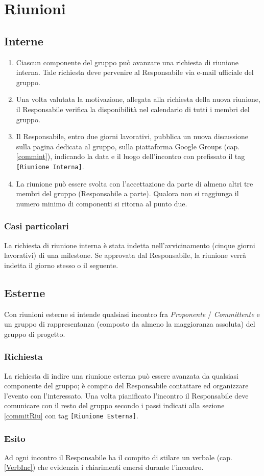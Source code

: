 \section{Riunioni}{

	\subsection{Interne}{
		\label{commitRiu}
		\begin{enumerate}
		
		\item Ciascun componente del gruppo può avanzare una richiesta di riunione interna. Tale richiesta deve pervenire al Responsabile via e-mail ufficiale del gruppo.
			
		\item Una volta valutata la motivazione, allegata alla richiesta della nuova riunione, il Responsabile verifica la disponibilità nel calendario di tutti i membri del gruppo. 
		
		\item Il Responsabile, entro due giorni lavorativi, pubblica un nuova discussione sulla pagina dedicata al gruppo, sulla piattaforma Google Groups (cap. \ref{commint}), indicando la data e il luogo dell'incontro con prefissato il tag \texttt{[Riunione Interna]}.
		
		\item La riunione può essere svolta con l'accettazione da parte di almeno altri tre membri del gruppo (Responsabile a parte). Qualora non si raggiunga il numero minimo di componenti si ritorna al punto due.
		\end{enumerate}
		
		\subsubsection{Casi particolari}{
			La richiesta di riunione interna è stata indetta nell'avvicinamento (cinque giorni lavorativi) di una milestone\g . Se approvata dal Responsabile, la riunione verrà indetta il giorno stesso o il seguente.
		}
	}

	\subsection{Esterne}{
		Con riunioni esterne si intende qualsiasi incontro fra \textit{Proponente} / \textit{Committente}  e un gruppo di rappresentanza (composto da almeno la maggioranza assoluta) del gruppo di progetto. 
		\subsubsection{Richiesta}{
			La richiesta di indire una riunione esterna  può essere avanzata da qualsiasi componente del gruppo; è compito del Responsabile contattare ed organizzare l'evento con l'interessato. Una volta pianificato l'incontro il Responsabile deve comunicare con il resto del gruppo secondo i passi indicati alla sezione \ref{commitRiu} con tag \texttt{[Riunione Esterna]}.
		}
		\subsubsection{Esito}{
			Ad ogni incontro il Responsabile  ha il compito di stilare un verbale (cap. \ref{VerbInc}) che evidenzia i chiarimenti emersi durante l'incontro.
		}
	}
}